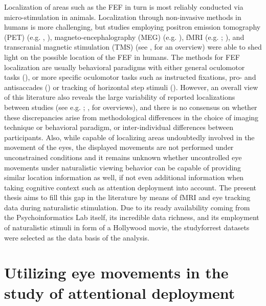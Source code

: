 \documentclass[a4paper, 12pt]{scrreprt}
\begin{document}
Localization of areas such as the FEF in turn is most reliably conducted via micro-stimulation in animals. Localization through non-invasive methods in humans is more challenging, but studies employing positron emission tomography (PET) (e.g. \textcite{paus1996location}, \cite{kawashima1998oculomotor}), magneto-encephalography (MEG) (e.g. \cite{ioannides2004meg}), fMRI (e.g. \cite{petit1999functional}; \cite{connolly2002human}), and transcranial magnetic stimulation (TMS) (see \textcite{vernet2014corrigendum}, for an overview) were able to shed light on the possible location of the FEF in humans. The methods for FEF localization are usually behavioral paradigms with either general oculomotor tasks (\cite{paus1996location}), or more specific oculomotor tasks such as instructed fixations, pro- and antisaccades (\cite{connolly2002human}) or tracking of horizontal step stimuli (\cite{alkan2011differentiation}). However, an overall view of this literature also reveals the large variability of reported localizations between studies (see e.g. \textcite{paus1996location}; \textcite{vernet2014corrigendum}, for overviews), and there is no consensus on whether these discrepancies arise from methodological differences in the choice of imaging technique or behavioral paradigm, or inter-individual differences between participants.  Also, while capable of localizing areas undoubtedly involved in the movement of the eyes, the displayed movements are not performed under unconstrained conditions and it remains unknown whether uncontrolled eye movements under naturalistic viewing behavior can be capable of providing similar location information as well, if not even additional information when taking cognitive context such as attention deployment into account.\newline
The present thesis aims to fill this gap in the literature by means of fMRI and eye tracking data during naturalistic stimulation. Due to its ready availability coming from the Psychoinformatics Lab itself, its incredible data richness, and its employment of naturalistic stimuli in form of a Hollywood movie, the studyforrest datasets were selected as the data basis of the analysis.

\section{Utilizing eye movements in the study of attentional deployment}\label{section:eyeutils}
\end{document}
